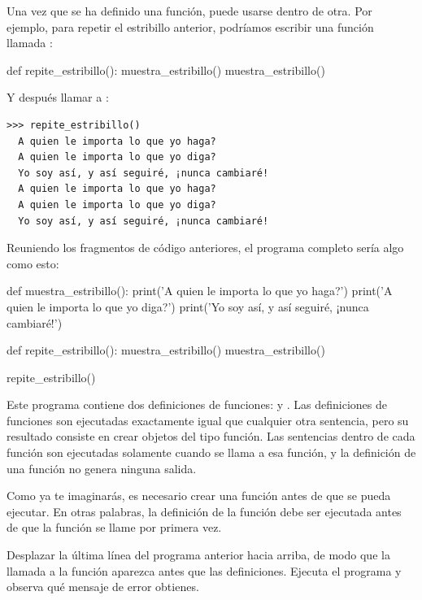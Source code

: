 Una vez que se ha definido una función, puede usarse dentro de otra. Por
ejemplo, para repetir el estribillo anterior, podríamos escribir una
función llamada :

\begin{python}[frame=single]
def repite_estribillo():
    muestra_estribillo()
    muestra_estribillo()
\end{python}

Y después llamar a :

\begin{Verbatim}[frame=single]
>>> repite_estribillo()
  A quien le importa lo que yo haga?
  A quien le importa lo que yo diga?
  Yo soy así, y así seguiré, ¡nunca cambiaré!
  A quien le importa lo que yo haga?
  A quien le importa lo que yo diga?
  Yo soy así, y así seguiré, ¡nunca cambiaré!
\end{Verbatim}


Reuniendo los fragmentos de código anteriores, el
programa completo sería algo como esto:

\begin{python}[frame=single]
def muestra_estribillo():
    print('A quien le importa lo que yo haga?')
    print('A quien le importa lo que yo diga?')
    print('Yo soy así, y así seguiré, ¡nunca cambiaré!')

def repite_estribillo():
    muestra_estribillo()
    muestra_estribillo()

repite_estribillo()
\end{python}

Este programa contiene dos definiciones de funciones:
 y . Las
definiciones de funciones son ejecutadas exactamente igual que cualquier
otra sentencia, pero su resultado consiste en crear objetos del tipo
función. Las sentencias dentro de cada función son ejecutadas solamente
cuando se llama a esa función, y la definición de una función no genera
ninguna salida.


Como ya te imaginarás, es necesario crear una función antes de que se
pueda ejecutar. En otras palabras, la definición de la función debe ser
ejecutada antes de que la función se llame por primera vez.

Desplazar la última línea del programa anterior
hacia arriba, de modo que la llamada a la función aparezca antes que las
definiciones. Ejecuta el programa y observa qué mensaje de error
obtienes.

